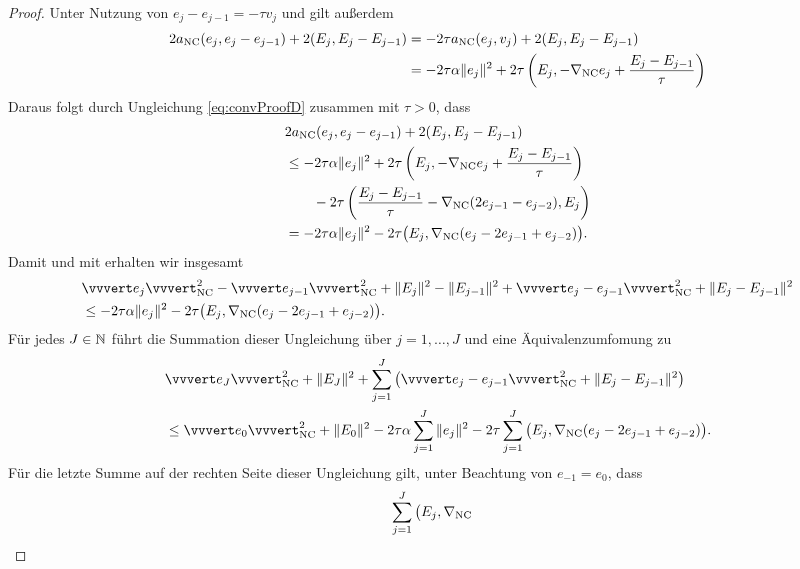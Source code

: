 \begin{proof}
  Unter Nutzung von $e_j-e_{j-1}=-\tau v_j$ und  
  gilt außerdem
  \begin{align*}
    2a_{\textup{NC}}(e_j,e_j-e_{j-1}) + 2(E_j,E_j-E_{j-1})
    &=
    -2\tau a_{\textup{NC}}(e_j,v_j) + 2(E_j,E_j-E_{j-1})\\
    &=
    -2\tau\alpha\Vert e_j\Vert^2 + 2\tau\left(E_j,
    -\nabla_{\textup{NC}} e_j+\frac{E_j-E_{j-1}}{\tau}\right) 
  \end{align*}
  Daraus folgt durch Ungleichung \eqref{eq:convProofD} zusammen mit $\tau>0$,
  dass
  \begin{align*}
    &2a_{\textup{NC}}(e_j,e_j-e_{j-1}) + 2(E_j,E_j-E_{j-1})\\
    &\leq
    -2\tau\alpha\Vert e_j\Vert^2 + 2\tau\left(E_j,
    -\nabla_{\textup{NC}} e_j+\frac{E_j-E_{j-1}}{\tau}\right)\\
    &\quad\quad-2\tau\left( \frac{E_j-E_{j-1}}{\tau}
    -\nabla_\textup{NC}(2e_{j-1}-e_{j-2}),E_j\right)\\
    &=
    -2\tau\alpha\Vert e_j\Vert^2 - 
    2\tau\big(E_j,\nabla_\textup{NC}(e_j-2e_{j-1}+e_{j-2})\big).
  \end{align*}
  Damit und mit  erhalten wir insgesamt
  \begin{align*}
    &\vvvert e_j \vvvert^2_\nc   -
    \vvvert e_{j-1}\vvvert_\nc^2 +
    \Vert E_j \Vert^2 - \Vert E_{j-1}\Vert^2 +
    \vvvert e_j-e_{j-1}\vvvert_\nc^2 +
    \Vert E_j - E_{j-1} \Vert^2\\
    &\leq
    -2\tau\alpha\Vert e_j\Vert^2 - 
    2\tau\big(E_j,\gradnc(e_j-2e_{j-1}+e_{j-2})\big).
  \end{align*}
  Für jedes $J\in\mathbb{N}$ führt die Summation dieser Ungleichung über
  $j=1,\ldots,J$ und eine Äquivalenzumfomung zu
  \begin{equation}
    \label{eq:convProofF}
    \begin{aligned}
      &\vvvert e_J \vvvert^2_\nc +\Vert E_J \Vert^2 
      +\sum_{j=1}^J\left(\vvvert e_j-e_{j-1} \vvvert_\nc^2 + 
      \Vert E_j-E_{j-1}\Vert^2\right)\\
      &\leq 
      \vvvert e_0 \vvvert_\nc^2 + \Vert E_0 \Vert^2 
      -2\tau\alpha\sum_{j=1}^J \Vert e_j\Vert^2 
      -2\tau \sum_{j=1}^J\big(E_j,\gradnc
      (e_j-2e_{j-1}+e_{j-2})\big).
    \end{aligned}
  \end{equation}
  Für die letzte Summe auf der rechten Seite dieser Ungleichung gilt, unter
  Beachtung von $e_{-1}=e_0$, dass
  \begin{align*}
    &\sum_{j=1}^J\big(E_j,\gradnc

\end{align*}
\end{proof}

